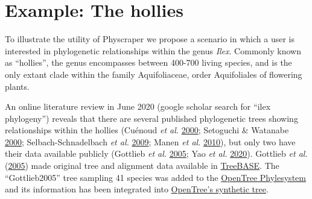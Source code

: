 \documentclass[]{article}
\begin{document}
\hypertarget{example-the-hollies}{%
\section{Example: The hollies}\label{example-the-hollies}}

To illustrate the utility of Physcraper we propose a scenario in which a user is interested in phylogenetic relationships within the genus \emph{Ilex}. Commonly known as ``hollies'', the genus encompasses between 400-700 living species, and is the only extant clade within the family Aquifoliaceae, order Aquifoliales of flowering plants.

An online literature review in June 2020 (google scholar search for ``ilex phylogeny'') reveals that there are several published phylogenetic trees showing relationships within the hollies (Cuénoud \emph{et al.} \protect\hyperlink{ref-cuenoud2000molecular}{2000}; Setoguchi \& Watanabe \protect\hyperlink{ref-setoguchi2000intersectional}{2000}; Selbach-Schnadelbach \emph{et al.} \protect\hyperlink{ref-selbach2009new}{2009}; Manen \emph{et al.} \protect\hyperlink{ref-manen2010history}{2010}), but only two have their data available publicly (Gottlieb \emph{et al.} \protect\hyperlink{ref-gottlieb2005molecular}{2005}; Yao \emph{et al.} \protect\hyperlink{ref-yao2020phylogeny}{2020}).
Gottlieb \emph{et al.} (\protect\hyperlink{ref-gottlieb2005molecular}{2005}) made original tree and alignment data available in \href{https://treebase.org/treebase-web/search/study/summary.html?id=1091}{TreeBASE}. The ``Gottlieb2005'' tree sampling 41 species was added to the \href{https://tree.opentreeoflife.org/curator/study/edit/pg_2827/?tab=home}{OpenTree Phylesystem} and its information has been integrated into \href{https://devtree.opentreeoflife.org/opentree/opentree12.3@mrcaott68451ott89474/Ilex-theizans--Ilex-dumosa}{OpenTree's synthetic tree}.
\end{document}
